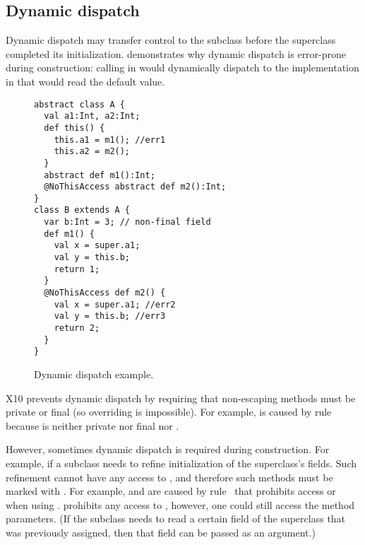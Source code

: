 \vspace{-0.2cm}
\subsection{Dynamic dispatch}
Dynamic dispatch may transfer control to the subclass
    before the superclass completed its initialization.
 demonstrates why dynamic dispatch is error-prone during construction:
    calling  in  would dynamically dispatch
    to the implementation in 
    that would read the default value.



\begin{figure}
\vspace{-0.2cm}\begin{lstlisting}
abstract class A {
  val a1:Int, a2:Int;
  def this() {
    this.a1 = m1(); //err1
    this.a2 = m2();
  }
  abstract def m1():Int;
  @NoThisAccess abstract def m2():Int;
}
class B extends A {
  var b:Int = 3; // non-final field
  def m1() {
    val x = super.a1;
    val y = this.b;
    return 1;
  }
  @NoThisAccess def m2() {
    val x = super.a1; //err2
    val y = this.b; //err3
    return 2;
  }
}
\end{lstlisting}\vspace{-0.2cm}
\caption{Dynamic dispatch example.
    }
\label{Figure:Dynamic-dispatch}
\end{figure}


X10 prevents dynamic dispatch by requiring that non-escaping methods
    must be private or final
    (so overriding is impossible).
For example,  is caused by rule~
    because  is neither private nor final nor .

However, sometimes dynamic dispatch is required during construction.
For example, if a subclass needs to refine initialization
    of the superclass's fields.
Such refinement cannot have any access to \this, and therefore
    such methods must be marked with .
For example,  and  are caused by rule~ that prohibits access \this or 
    when using .
 prohibits any access to \this,
    however, one could still access the method parameters.
(If the subclass needs to read a certain field of the superclass that was previously assigned,
    then that field can be passed as an argument.) %


